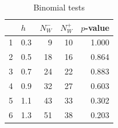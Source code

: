 \documentclass[12pt]{article}
\begin{document}
\begin{table}[htpb!]
\centering
\caption{Binomial tests}
\begin{tabular}{llrrr}
  \hline
 & $h$ & $N_W^-$ & $N_W^+$ & $p$-value \\ 
  \hline
1 & 0.3 & 9 & 10 & 1.000 \\ 
  2 & 0.5 & 18 & 16 & 0.864 \\ 
  3 & 0.7 & 24 & 22 & 0.883 \\ 
  4 & 0.9 & 32 & 27 & 0.603 \\ 
  5 & 1.1 & 43 & 33 & 0.302 \\ 
  6 & 1.3 & 51 & 38 & 0.203 \\ 
   \hline
\end{tabular}
\end{table}
\end{document}
